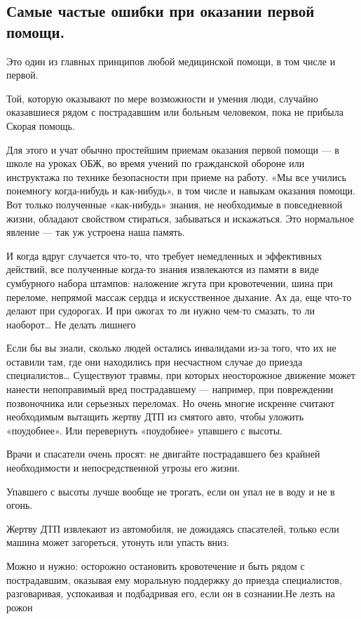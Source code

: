 \documentclass[a4paper, 12pt]{article}
\theoremstyle{definition}
\begin{document}
        \subsection{Самые частые ошибки при оказании первой помощи.}
        Это один из главных принципов любой медицинской помощи, в том числе и первой.

        Той, которую оказывают по мере  возможности и умения люди, случайно оказавшиеся рядом с пострадавшим или больным человеком, пока не прибыла Скорая помощь.

        Для этого и учат обычно простейшим приемам оказания первой помощи — в школе на уроках ОБЖ, во время учений по гражданской обороне или инструктажа по технике безопасности при приеме на работу. «Мы все учились понемногу когда-нибудь и как-нибудь», в том числе и навыкам оказания помощи. Вот только полученные «как-нибудь» знания, не необходимые в повседневной жизни, обладают свойством стираться, забываться и искажаться. Это нормальное явление — так уж устроена наша память.

        И когда вдруг случается что-то, что требует немедленных и эффективных действий, все полученные когда-то знания извлекаются из памяти в виде сумбурного набора штампов: наложение жгута при кровотечении, шина при переломе, непрямой массаж сердца и искусственное дыхание. Ах да, еще что-то делают при судорогах. И при ожогах то ли нужно чем-то смазать, то ли наоборот… Не делать лишнего

        Если бы вы знали, сколько людей остались инвалидами из-за того, что их не оставили там, где они находились при несчастном случае до приезда специалистов… Существуют травмы, при которых неосторожное движение может нанести непоправимый вред пострадавшему — например, при повреждении позвоночника или серьезных переломах. Но очень многие искренне считают необходимым вытащить жертву ДТП из смятого авто, чтобы уложить «поудобнее». Или перевернуть «поудобнее» упавшего с высоты.

        Врачи и спасатели очень просят: не двигайте пострадавшего без крайней необходимости и непосредственной угрозы его жизни.
 
        Упавшего с высоты лучше вообще не трогать, если он упал не в воду и не в огонь. 

        Жертву ДТП извлекают из автомобиля, не дожидаясь спасателей, только если машина может загореться, утонуть или упасть вниз.

        Можно и нужно: осторожно остановить кровотечение и быть рядом с пострадавшим, оказывая ему моральную поддержку до приезда специалистов, разговаривая, успокаивая и подбадривая его, если он в сознании.Не лезть на рожон
        
\end{document}

